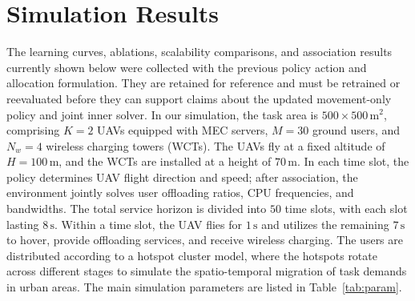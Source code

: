 \documentclass[journal]{IEEEtran}
\begin{document}
\section{Simulation Results}\label{sec:experiment}
The learning curves, ablations, scalability comparisons, and association results currently shown below were collected with the previous policy action and allocation formulation. They are retained for reference and must be retrained or reevaluated before they can support claims about the updated movement-only policy and joint inner solver.
In our simulation, the task area is $500 \times 500 \,\text{m}^2$, comprising $K=2$ UAVs equipped with MEC servers, $M=30$ ground users, and $N_w =4$ wireless charging towers (WCTs). The UAVs fly at a fixed altitude of $H=100\,\text{m}$, and the WCTs are installed at a height of $70\,\text{m}$. In each time slot, the policy determines UAV flight direction and speed; after association, the environment jointly solves user offloading ratios, CPU frequencies, and bandwidths. The total service horizon is divided into $50$ time slots, with each slot lasting $8\,\text{s}$. Within a time slot, the UAV flies for $1\,\text{s}$ and utilizes the remaining $7\,\text{s}$ to hover, provide offloading services, and receive wireless charging. The users are distributed according to a hotspot cluster model, where the hotspots rotate across different stages to simulate the spatio-temporal migration of task demands in urban areas. The main simulation parameters are listed in Table~\ref{tab:param}.
\end{document}
